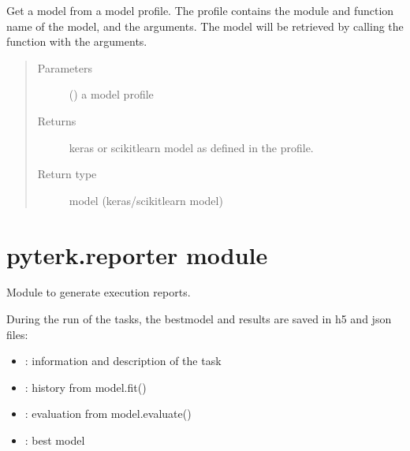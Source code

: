 \documentclass[letterpaper,10pt,english]{sphinxmanual}
\begin{document}
\begin{fulllineitems}
\label{\detokenize{PyTerK:pyterk.models.get_model}}
\sphinxAtStartPar
Get a model from a model profile.
The profile contains the module and function name of the model, and the arguments.
The model will be retrieved by calling the function with the arguments.
\begin{quote}\begin{description}
\item[{Parameters}] \leavevmode
\sphinxAtStartPar
{} () \textendash{} a model profile

\item[{Returns}] \leavevmode
\sphinxAtStartPar
keras or scikitlearn model as defined in the profile.

\item[{Return type}] \leavevmode
\sphinxAtStartPar
model (keras/scikitlearn model)

\end{description}\end{quote}

\end{fulllineitems}



\section{pyterk.reporter module}
\label{\detokenize{PyTerK:module-pyterk.reporter}}\label{\detokenize{PyTerK:pyterk-reporter-module}}
\sphinxAtStartPar
Module to generate execution reports.

\sphinxAtStartPar
During the run of the tasks, the bestmodel and results are saved in h5 and json files:
\begin{itemize}
\item {} 
\sphinxAtStartPar
{} : information and description of the task

\item {} 
\sphinxAtStartPar
{} : history from model.fit()

\item {} 
\sphinxAtStartPar
{} : evaluation from model.evaluate()

\item {} 
\sphinxAtStartPar
{} : best model

\end{itemize}
\end{document}
